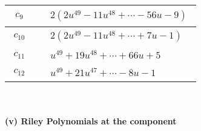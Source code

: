 \documentclass[1p]{elsarticle_modified}
\theoremstyle{definition}
\begin{document}
\begin{tabular}{m{50pt}|m{274pt}}
\hline $$\begin{aligned}c_{9}\end{aligned}$$&$\begin{aligned}
&2(2 u^{49}-11 u^{48}+\cdots-56 u-9)
\end{aligned}$\\
\hline $$\begin{aligned}c_{10}\end{aligned}$$&$\begin{aligned}
&2(2 u^{49}-11 u^{48}+\cdots+7 u-1)
\end{aligned}$\\
\hline $$\begin{aligned}c_{11}\end{aligned}$$&$\begin{aligned}
&u^{49}+19 u^{48}+\cdots+66 u+5
\end{aligned}$\\
\hline $$\begin{aligned}c_{12}\end{aligned}$$&$\begin{aligned}
&u^{49}+21 u^{47}+\cdots-8 u-1
\end{aligned}$\\
\hline
\end{tabular}\\~\\
\newpage\renewcommand{\arraystretch}{1}
\flushleft \textbf{(v) Riley Polynomials at the component}\newline \\
\end{document}
